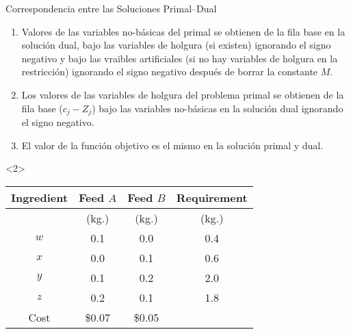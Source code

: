 \begin{frame}{Correspondencia entre las Soluciones Primal--Dual}

  \begin{enumerate} \justifying \parskip3mm
  \item Valores de las variables no-básicas del primal se obtienen de la fila base en la solución dual, bajo las variables de holgura (si existen) ignorando el signo negativo y bajo las vraibles artificiales (si no hay variables de holgura en la restricción) ignorando el signo negativo después de borrar la constante $M$.
  \item Los valores de las variables de holgura del problema primal se obtienen de la fila base ($c_j - Z_j$) bajo las variables no-básicas en la solución dual ignorando el signo negativo.
  \item El valor de la función objetivo es el mismo en la solución primal y dual.
  \end{enumerate}
\end{frame}



\begin{frameExample}{}{}

  \begin{onlyenv}<2>
      {\centering
    \begin{tabular}{cccc}
      \toprule
      Ingredient&Feed $A$& Feed $B$& Requirement\\
      \midrule
      &(kg.)&(kg.)&(kg.)\\
$w$&0.1&0.0&0.4\\
$x$&0.0&0.1&0.6\\
$y$&0.1&0.2&2.0\\
      $z$&0.2&0.1&1.8\\
      \midrule
      Cost&\$0.07&\$0.05\\
      \bottomrule
    \end{tabular}
  \par}
\end{onlyenv}

\end{frameExample}


